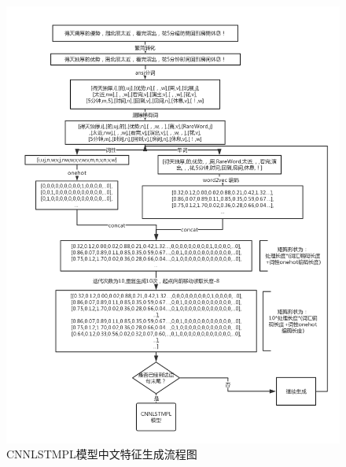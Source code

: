 \begin{figure}[!htbp]
\begin{center}
\includegraphics[width=\textwidth]{graphic/preprocessrzh.png}
\caption{CNNLSTMPL模型中文特征生成流程图 \label{fig:preprocessrzh}}
\end{center}
\end{figure}


